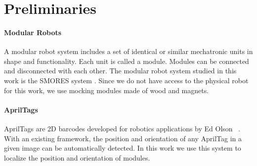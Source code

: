 \section{Preliminaries}\label{prelim}
\paragraph{Modular Robots} A modular robot system includes a set of identical or similar mechatronic units in shape and functionality. Each unit is called a module. Modules can be connected and disconnected with each other. The modular robot system studied in this work is the SMORES system \cite{smores}. Since we do not have access to the physical robot for this work, we use mocking modules made of wood and magnets.


\paragraph{AprilTags} AprilTags are 2D barcodes developed for robotics applications by Ed Olson ~\cite{Olson11}. With an existing framework, the position and orientation of any AprilTag in a given image can be automatically detected. In this work we use this system to localize the position and orientation of modules.
